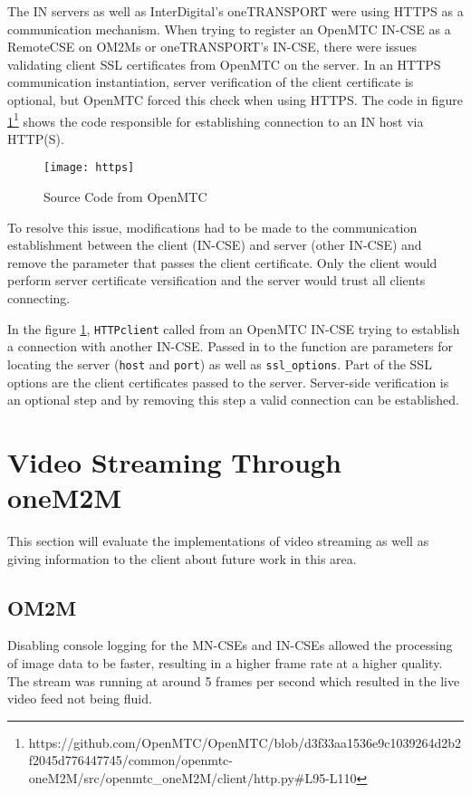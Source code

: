 The IN servers as well as InterDigital's oneTRANSPORT were using HTTPS as a communication mechanism. When trying to register an OpenMTC IN-CSE as a RemoteCSE on OM2Ms or oneTRANSPORT's IN-CSE, there were issues validating client SSL certificates from OpenMTC on the server. In an HTTPS communication instantiation, server verification of the client certificate is optional, but OpenMTC forced this check when using HTTPS. The code in figure \ref{https}\footnote{https://github.com/OpenMTC/OpenMTC/blob/d3f33aa1536e9c1039264d2b2f2045d776447745/common/openmtc-oneM2M/src/openmtc\_oneM2M/client/http.py\#L95-L110} shows the code responsible for establishing connection to an IN host via HTTP(S). 

\begin{figure}[H]
  \centering
  \texttt{[image: https]}
  \caption{Source Code from OpenMTC}
  \label{https}
\end{figure}

To resolve this issue, modifications had to be made to the communication establishment between the client (IN-CSE) and server (other IN-CSE) and remove the parameter that passes the client certificate. Only the client would perform server certificate versification and the server would trust all clients connecting. 

In the figure \ref{https}, \lstinline{HTTPclient} called from an OpenMTC IN-CSE trying to establish a connection with another IN-CSE. Passed in to the function are parameters for locating the server (\lstinline{host} and \lstinline{port}) as well as \lstinline{ssl_options}. Part of the SSL options are the client certificates passed to the server. Server-side verification is an optional step and by removing this step a valid connection can be established. 

\section{Video Streaming Through oneM2M}

This section will evaluate the implementations of video streaming as well as giving information to the client about future work in this area.

\subsection{OM2M}

Disabling console logging for the MN-CSEs and IN-CSEs allowed the processing of image data to be faster, resulting in a higher frame rate at a higher quality. The stream was running at around 5 frames per second which resulted in the live video feed not being fluid.

